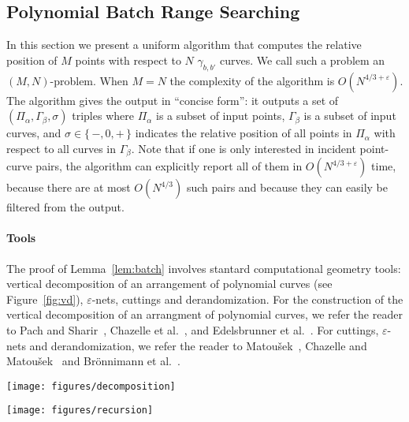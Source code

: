 \subsection{Polynomial Batch Range Searching}%
\label{sec:algo:point-curves-location}

In this section we present a uniform algorithm that computes the relative
position of \(M\) points with respect to \(N\) $\gamma_{b,b'}$ curves. We call
such a problem an \((M,N)\)-problem. When \(M=N\) the complexity of the
algorithm is \(O(N^{4/3+\varepsilon})\).
The algorithm gives the output in ``concise form'':
it outputs a set of $(\Pi_\alpha, \Gamma_\beta, \sigma)$ triples where
$\Pi_\alpha$ is a subset of input points, $\Gamma_\beta$ is a subset of input curves, and $\sigma \in
\{\,-,0,+\,\}$ indicates the relative position of all points in $\Pi_\alpha$ with
respect to all curves in $\Gamma_\beta$.
Note that if one is only interested in incident point-curve pairs, the
algorithm can explicitly report all of them in
$O(N^{4/3+\varepsilon})$ time, because there are at most $O(N^{4/3})$
such pairs and because they can easily be filtered from the output.

\paragraph{Tools} The proof of Lemma~\ref{lem:batch} involves stantard
computational geometry tools: vertical decomposition of an
arrangement of polynomial curves (see Figure~\ref{fig:vd}),
$\varepsilon$-nets, cuttings and derandomization.
For the construction of the vertical
decomposition of an arrangment of polynomial curves, we refer the reader to
Pach and Sharir~\cite{Alcala}, Chazelle et al.~\cite{CEGS91}, and Edelsbrunner
et al.~\cite{EGPPSS92}. For cuttings, $\varepsilon$-nets and derandomization, we
refer the reader to Matou\v{s}ek~\cite{M95,M96}, Chazelle and
Matou\v{s}ek~\cite{CM96} and Brönnimann et al.~\cite{BCM99}.
\begin{figure*}
    \centering
    \texttt{[image: figures/decomposition]}
    \caption{Some curves in $\mathbb{R}^2$.}
    \label{fig:some-curves-in-R2}
\end{figure*}
\begin{figure*}
    \centering
    \texttt{[image: figures/recursion]}
    \caption{Vertical decomposition of the curves in Figure~\ref{fig:some-curves-in-R2}.}%
    \label{fig:vd}
\end{figure*}

